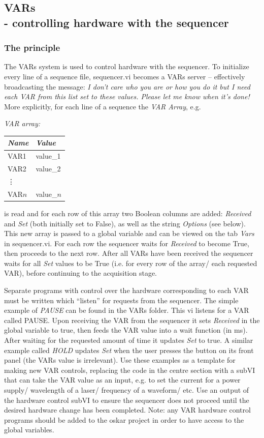 \documentclass[10pt,a4paper]{article}
\begin{document}
\subsection[VARs]{\label{sex:var}VARs \\ %
	\normalsize - controlling hardware with the sequencer}

\subsubsection{The principle}
The VARs system is used to control hardware with the sequencer.  To initialize every line of a sequence file, sequencer.vi becomes a VARs server -- effectively broadcasting the message: \emph{I don't care who you are or how you do it but I need each VAR from this list set to these values. Please let me know when it's done!}  More explicitly, for each line of a sequence the \emph{VAR Array}, e.g.

\hangindent=0.7cm
\emph{VAR array:} \\
\begin{tabularx}{0.3\textwidth}{X|X}
	\emph{Name} & \emph{Value} \\
	\hline
	VAR1 & value\_1 \\
	VAR2 & value\_2 \\
	\vdots & \\
	VAR$n$ & value\_$n$ \\
\end{tabularx}

\noindent is read and for each row of this array two Boolean columns are added: \emph{Received} and \emph{Set} (both initially set to False), as well as the string \emph{Options} (see below).  This new array is passed to a global variable and can be viewed on the tab \emph{Vars} in sequencer.vi.  For each row the sequencer waits for \emph{Received} to become True, then proceeds to the next row. After all VARs have been received the sequencer waits for all \emph{Set} values to be True (i.e. for every row of the array/ each requested VAR), before continuing to the acquisition stage.

Separate programs with control over the hardware corresponding to each VAR must be written which ``listen'' for requests from the sequencer.  The simple example of \emph{PAUSE} can be found in the VARs folder.  This vi listens for a VAR called PAUSE. Upon receiving the VAR from the sequencer it sets \emph{Received} in the global variable to true, then feeds the VAR value into a wait function (in ms). After waiting for the requested amount of time it updates \emph{Set} to true.  A similar example called \emph{HOLD} updates \emph{Set} when the user presses the button on its front panel (the VARs value is irrelevant). Use these examples as a template for making new VAR controls, replacing the code in the centre section with a subVI that can take the VAR value as an input, e.g. to set the current for a power supply/ wavelength of a  laser/ frequency of a waveform/ etc.  Use an output of the hardware control subVI to ensure the sequencer does not proceed until the desired hardware change has been completed. Note: any VAR hardware control programs should be added to the oskar project in order to have access to the global variables.
\end{document}
